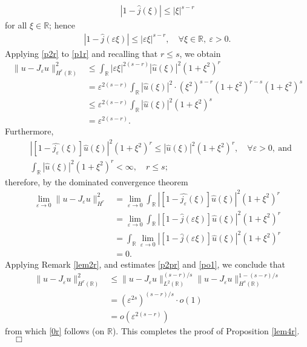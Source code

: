 \documentclass[12pt,reqno]{amsart}
\newcommand{\rr}{\mathbb{R}}
\newcommand{\ee}{\varepsilon}
\theoremstyle{plain}  %
\theoremstyle{definition}
\begin{document}
\begin{equation*}
	\begin{split}
		|1 - \widehat{j } (\xi) | \le |\xi|^{s-r}
	\end{split}
\end{equation*}
for all $\xi \in \rr$; hence
\begin{equation}
	\begin{split}
		|1 - \widehat{ j }(\ee \xi)| \le |\ee \xi |^{s-r}, \quad \forall
		\xi \in \rr, \ \ee > 0.
		\label{p2r}
	\end{split}
\end{equation}
Applying \eqref{p2r} to \eqref{p1r} and recalling that $r \le s$, we obtain
\begin{equation}
	\label{p2pr}
	\begin{split}
	\|u - J_\ee u\|_{H^r(\rr)}^2 
	& \le \int_{\rr}  |\ee \xi |^{2(s-r)}
	|\widehat{u}(\xi)|^2 (1 + \xi^2)^r
	\\
	& = \ee^{2(s-r)} \int_{\rr} |\widehat{u}(\xi)|^2  \cdot (\xi^2)^{s-r}
	(1 + \xi^2)^{r-s} (1 + \xi^2)^{s}
	\\
	& \le \ee^{2(s-r)}
	\int_{\rr} |\widehat{u}(\xi)|^2 (1 + \xi^2)^s
	\\
	& =  \ee^{2(s-r)}.
	\end{split}
\end{equation}
Furthermore,
\begin{equation*}
	\begin{split}
		& |[1- \widehat{j_\ee}(\xi)] \widehat{u}(\xi)|^2 (1 + \xi^2)^r \le
		|\widehat{u}(\xi)|^2 (1 + \xi^2)^r, \quad \forall \ee > 0, \ 
		\text{and}
		\\
		& \int_{\rr} |\widehat{u}(\xi)|^2 (1 + \xi^2)^r < \infty,
		\quad r \le s;
	\end{split}
\end{equation*}
therefore, by the dominated convergence theorem
\begin{equation}
	\label{po1}
	\begin{split}
		\lim_{\ee \to 0} \|u - J_\ee u \|_{H^r }^2 
		& = \lim_{\ee \to 0} \int_{\rr} |[1-\widehat{j_\ee}(\xi)]
		\widehat{u}(\xi) |^2 (1 + \xi^2)^r
		\\
		& = \lim_{\ee \to 0} \int_{\rr} |[1-\widehat{j}(\ee \xi)]
		\widehat{u}(\xi) |^2 (1 + \xi^2)^r
		\\
		& = \int_{\rr} \lim_{\ee \to 0} |[1-\widehat{j}(\ee \xi)]
		\widehat{u}(\xi) |^2 (1 + \xi^2)^r
		\\
		& = 0.
	\end{split}
\end{equation}
Applying Remark \ref{lem2r}, and estimates \eqref{p2pr} and \eqref{po1}, we 
conclude that
\begin{equation*}
	\begin{split}
		\|u - J_\ee u \|_{H^r(\rr)}^2
		& \le \|u - J_\ee u
		\|_{L^2(\rr)}^{(s-r)/s} \|u - J_\ee u \|_{H^s(\rr)}^{1 -
		(s-r)/s}
		\\
		& = \left( \ee^{2s} \right)^{(s-r)/s} \cdot o(1)
		\\
		& = o(\ee^{2(s-r)})
	\end{split}
\end{equation*}
from which \eqref{0r} follows (on $\rr$).
This completes the proof of Proposition
\ref{lem4r}.  $\quad \Box$
\vskip0.1in
 

				  
\end{document}
